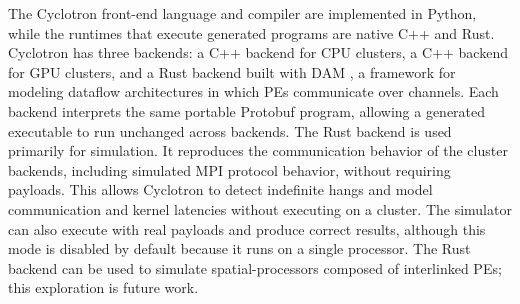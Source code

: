 \documentclass[sigplan, nonacm]{acmart}
\begin{document}
The Cyclotron front-end language and compiler are implemented in Python, while the runtimes that execute generated programs are native C++ and Rust. Cyclotron has three backends: a C++ backend for CPU clusters, a C++ backend for GPU clusters, and a Rust backend built with DAM \citep{zhang2024dataflow}, a framework for modeling dataflow architectures in which PEs communicate over channels. Each backend interprets the same portable Protobuf program, allowing a generated executable to run unchanged across backends. The Rust backend is used primarily for simulation. It reproduces the communication behavior of the cluster backends, including simulated MPI protocol behavior, without requiring payloads. This allows Cyclotron to detect indefinite hangs and model communication and kernel latencies without executing on a cluster. The simulator can also execute with real payloads and produce correct results, although this mode is disabled by default because it runs on a single processor. The Rust backend can be used to simulate spatial-processors composed of interlinked PEs; this exploration is future work.

\end{document}
